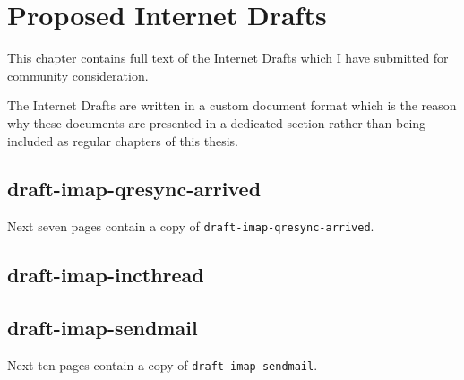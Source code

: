 \documentclass[trojita]{subfiles}
\begin{document}
\chapter{Proposed Internet Drafts}
\label{sec:id-manuscripts}

This chapter contains full text of the Internet Drafts which I have submitted for community consideration.

The Internet Drafts are written in a custom document format which is the reason why these documents are presented in a
dedicated section rather than being included as regular chapters of this thesis.

\section{draft-imap-qresync-arrived}
\label{sec:draft-imap-qresync-arrived}

Next seven pages contain a copy of {\tt draft-imap-qresync-arrived}.



\section{draft-imap-incthread}
\label{sec:draft-imap-incthread}


\section{draft-imap-sendmail}
\label{sec:draft-imap-sendmail}

Next ten pages contain a copy of {\tt draft-imap-sendmail}.


\end{document}
